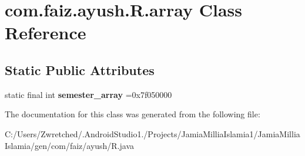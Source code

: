 \hypertarget{classcom_1_1faiz_1_1ayush_1_1_r_1_1array}{}\section{com.\+faiz.\+ayush.\+R.\+array Class Reference}
\label{classcom_1_1faiz_1_1ayush_1_1_r_1_1array}
\subsection*{Static Public Attributes}
\begin{DoxyCompactItemize}
\item 
\hypertarget{classcom_1_1faiz_1_1ayush_1_1_r_1_1array_a9af318f5a68253e5d2307bd558e6686d}{}static final int {\bfseries semester\+\_\+array} =0x7f050000\label{classcom_1_1faiz_1_1ayush_1_1_r_1_1array_a9af318f5a68253e5d2307bd558e6686d}

\end{DoxyCompactItemize}


The documentation for this class was generated from the following file\+:\begin{DoxyCompactItemize}
\item 
C\+:/\+Users/\+Zwretched/.\+Android\+Studio1./\+Projects/\+Jamia\+Millia\+Islamia1/\+Jamia\+Millia\+Islamia/gen/com/faiz/ayush/R.\+java\end{DoxyCompactItemize}
